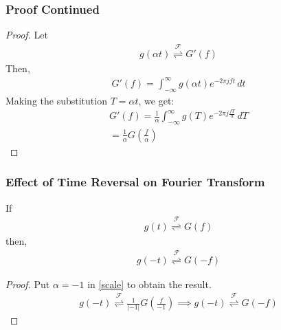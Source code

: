\documentclass{beamer}
\providecommand{\brak}[1]{\ensuremath{\left(#1\right)}}
\providecommand{\fourier}{\overset{\mathcal{F}}{ \rightleftharpoons}}
\providecommand{\abs}[1]{\left\vert#1\right\vert}
\begin{document}
\begin{frame}[fragile]
\frametitle{Proof Continued}
\begin{flushleft}
\begin{proof}
Let 
\begin{align}
    g(\alpha t) \fourier G'(f)
\end{align}
Then,
\begin{align}
    G'(f) = \int_{-\infty}^\infty g(\alpha t) e^{-2\pi j ft} \,dt
\end{align}
Making the substitution $T = \alpha t$, we get:
\begin{align}
     G'(f) = \frac{1}{\alpha}\int_{-\infty}^\infty g(T) e^{-2\pi j \frac{f T}{\alpha}} \,dT\\
     = \frac{1}{\alpha}G\brak{\frac{f}{\alpha}}
\end{align}
\end{proof}
\end{flushleft}

\end{frame}

\begin{frame}[fragile]
\frametitle{Effect of Time Reversal on Fourier Transform}
\begin{flushleft}
\begin{lemma}
If 
\begin{align}
    g(t) \fourier G(f)
\end{align}
then,
\begin{align}
    g(- t) \fourier G(-f)
\end{align}
\label{reverse}
\end{lemma}
\begin{proof}
Put $\alpha = -1$ in \eqref{scale} to obtain the result.
\begin{align}
    g(-t) \fourier \frac{1}{\abs{-1}}G\brak{\frac{f}{-1}} \implies
    g(-t) \fourier G(-f)
\end{align}
\end{proof}
\end{flushleft}

\end{frame}
\end{document}
